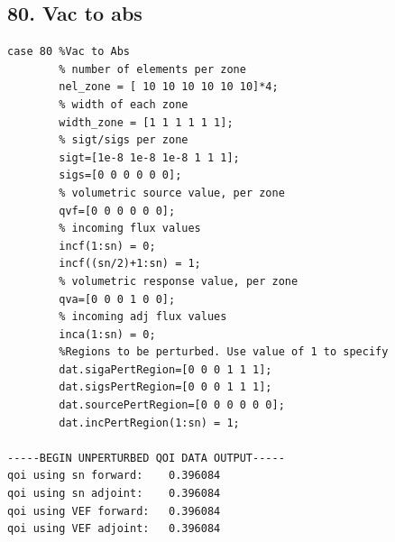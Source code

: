 \documentclass{article}
\begin{document}
\subsection{80. Vac to abs}
\begin{verbatim}
case 80 %Vac to Abs
        % number of elements per zone
        nel_zone = [ 10 10 10 10 10 10]*4;
        % width of each zone
        width_zone = [1 1 1 1 1 1];
        % sigt/sigs per zone
        sigt=[1e-8 1e-8 1e-8 1 1 1];
        sigs=[0 0 0 0 0 0];
        % volumetric source value, per zone
        qvf=[0 0 0 0 0 0];
        % incoming flux values
        incf(1:sn) = 0;
        incf((sn/2)+1:sn) = 1;
        % volumetric response value, per zone
        qva=[0 0 0 1 0 0];
        % incoming adj flux values
        inca(1:sn) = 0;
        %Regions to be perturbed. Use value of 1 to specify
        dat.sigaPertRegion=[0 0 0 1 1 1];
        dat.sigsPertRegion=[0 0 0 1 1 1];
        dat.sourcePertRegion=[0 0 0 0 0 0];
        dat.incPertRegion(1:sn) = 1;
        
-----BEGIN UNPERTURBED QOI DATA OUTPUT----- 
qoi using sn forward: 	 0.396084 
qoi using sn adjoint: 	 0.396084 
qoi using VEF forward: 	 0.396084 
qoi using VEF adjoint: 	 0.396084 
\end{verbatim}
\end{document}
